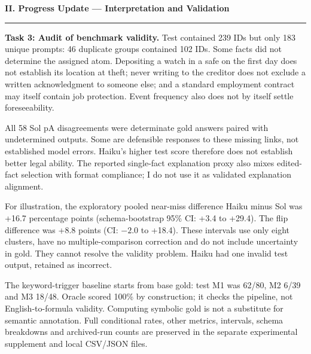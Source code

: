 \documentclass[12pt,a4paper]{article}
\newcommand{\heading}[1]{\textbf{#1}\par\nobreak\vspace{2pt}\hrule\vspace{4pt}}
\begin{document}
\begin{mdframed}[style=vinframe]
\heading{II. Progress Update --- Interpretation and Validation}
\textbf{Task 3: Audit of benchmark validity.} Test contained 239 IDs but only 183 unique prompts: 46 duplicate groups contained 102 IDs. Some facts did not determine the assigned atom. Depositing a watch in a safe on the first day does not establish its location at theft; never writing to the creditor does not exclude a written acknowledgment to someone else; and a standard employment contract may itself contain job protection. Event frequency also does not by itself settle foreseeability.

All 58 Sol pA disagreements were determinate gold answers paired with undetermined outputs. Some are defensible responses to these missing links, not established model errors. Haiku's higher test score therefore does not establish better legal ability. The reported single-fact explanation proxy also mixes edited-fact selection with format compliance; I do not use it as validated explanation alignment.

For illustration, the exploratory pooled near-miss difference Haiku minus Sol was +16.7 percentage points (schema-bootstrap 95\% CI: +3.4 to +29.4). The flip difference was +8.8 points (CI: $-2.0$ to +18.4). These intervals use only eight clusters, have no multiple-comparison correction and do not include uncertainty in gold. They cannot resolve the validity problem. Haiku had one invalid test output, retained as incorrect.

The keyword-trigger baseline starts from base gold: test M1 was 62/80, M2 6/39 and M3 18/48. Oracle scored 100\% by construction; it checks the pipeline, not English-to-formula validity. Computing symbolic gold is not a substitute for semantic annotation. Full conditional rates, other metrics, intervals, schema breakdowns and archived-run counts are preserved in the separate experimental supplement and local CSV/JSON files.

\end{mdframed}
\newpage
\end{document}
